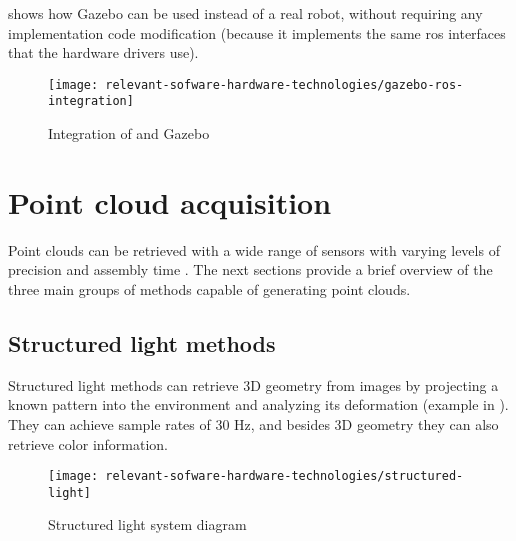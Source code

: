  shows how Gazebo can be used instead of a real robot, without requiring any implementation code modification (because it implements the same \gls{ros} interfaces that the hardware drivers use).

\begin{figure}[ht]
	\centering
	\texttt{[image: relevant-sofware-hardware-technologies/gazebo-ros-integration]}
	\caption[Integration of  and Gazebo]{Integration of  and Gazebo\protect\footnotemark}
	\label{fig:relevant-sofware-hardware-technologies_gazebo-ros-integration}
\end{figure}

\clearpage



\section{Point cloud acquisition}\label{sec:relevant-sofware-hardware-technologies_point-cloud-acquisition}

Point clouds can be retrieved with a wide range of sensors with varying levels of precision and assembly time \cite{Sansoni2009}. The next sections provide a brief overview of the three main groups of methods capable of generating point clouds.


\subsection{Structured light methods}

Structured light methods can retrieve 3D geometry from images by projecting a known pattern into the environment and analyzing its deformation (example in ). They can achieve sample rates of 30 Hz, and besides 3D geometry they can also retrieve color information.

\begin{figure}[H]
	\centering
	\texttt{[image: relevant-sofware-hardware-technologies/structured-light]}
	\caption[Structured light system diagram]{Structured light system diagram\protect\footnotemark}
	\label{fig:relevant-sofware-hardware-technologies_structured-light}
\end{figure}


